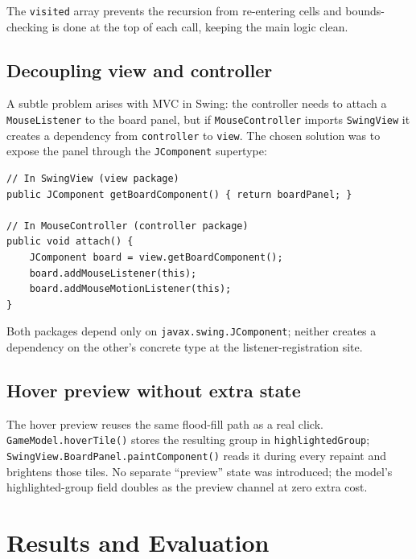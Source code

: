 \documentclass[12pt,a4paper]{article}
\begin{document}
The \texttt{visited} array prevents the recursion from re-entering cells and
bounds-checking is done at the top of each call, keeping the main logic clean.

\subsection{Decoupling view and controller}

A subtle problem arises with MVC in Swing: the controller needs to attach a
\texttt{MouseListener} to the board panel, but if \texttt{MouseController}
imports \texttt{SwingView} it creates a dependency from
\texttt{controller} to \texttt{view}.
The chosen solution was to expose the panel through the \texttt{JComponent}
supertype:

\begin{lstlisting}[caption={\texttt{SwingView.getBoardComponent()} breaks the cycle},
                   label={lst:decouple}]
// In SwingView (view package)
public JComponent getBoardComponent() { return boardPanel; }

// In MouseController (controller package)
public void attach() {
    JComponent board = view.getBoardComponent();
    board.addMouseListener(this);
    board.addMouseMotionListener(this);
}
\end{lstlisting}

Both packages depend only on \texttt{javax.swing.JComponent}; neither creates
a dependency on the other's concrete type at the listener-registration site.

\subsection{Hover preview without extra state}

The hover preview reuses the same flood-fill path as a real click.
\texttt{GameModel.hoverTile()} stores the resulting group in
\texttt{highlightedGroup}; \texttt{SwingView.BoardPanel.paintComponent()}
reads it during every repaint and brightens those tiles.
No separate ``preview'' state was introduced; the model's highlighted-group
field doubles as the preview channel at zero extra cost.

\section{Results and Evaluation}
\label{sec:results}
\end{document}
